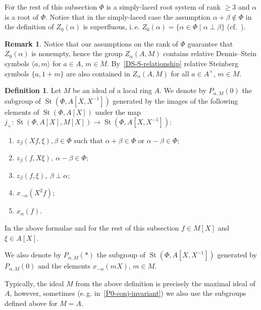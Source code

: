 \documentclass[oneside, 8pt]{amsart}
\theoremstyle{remark}
\theoremstyle{definition}
\numberwithin{lemma}{section}
\numberwithin{prop}{section}
\numberwithin{corollary}{section}
\numberwithin{externaltheorem}{section}
\newtheorem{df}[lemma]{Definition} \Crefname{df}{Definition}{Definitions}
\newtheorem{rem}[lemma]{Remark}
\DeclareMathOperator{\St}{St}
\numberwithin{equation}{section}
\begin{document}
For the rest of this subsection $\Phi$ is a simply-laced root system of rank $\geq 3$ and $\alpha$ is a root of $\Phi$. Notice that in the simply-laced case the assumption $\alpha+\beta\not\in \Phi$ in the definition of $Z_0(\alpha)$ is superfluous, i.\,e. $Z_0(\alpha) = \{ \alpha\in\Phi \mid \alpha \perp \beta \}$
(cf.~\cite[Proposition~5.7]{St71}).

\begin{rem}\label{Z-DS} Notice that our assumptions on the rank of $\Phi$ guarantee that $Z_0(\alpha)$ is nonempty, hence the group $Z_\alpha(A, M)$ contains relative Dennis--Stein symbols $\langle a, m \rangle$ for $a\in A$, $m\in M$.
By~\eqref{DS-S-relationship} relative Steinberg symbols $\{a, 1+m\}$ are also contained in $Z_\alpha(A, M)$ for all $a\in A^\times$, $m\in M$. \end{rem}

\begin{df} \label{defP0}
Let $M$ be an ideal of a local ring $A$. We denote by $P_{\alpha, M}(0)$ the subgroup of $\St(\Phi, A[X, X^{-1}])$ generated by the images of the following elements of $\St(\Phi, A[X])$ under the
 map $j_+ \colon \overline{\St}(\Phi, A[X], M[X]) \to \St(\Phi, A[X, X^{-1}])$:
\begin{enumerate} \item $z_{\beta}(Xf, \xi), \beta \in \Phi \text{ such that }\alpha + \beta \in \Phi\text{ or } \alpha - \beta \in \Phi;$
 \item $z_{\beta}(f, X\xi),\ \alpha - \beta \in \Phi;$
 \item $z_{\beta}(f, \xi),\ \beta \perp \alpha;$
 \item $x_{-\alpha}(X^2f);$
 \item $x_{\alpha}(f)$. \end{enumerate}
In the above formulae and for the rest of this subsection $f \in M[X]$ and $\xi \in A[X]$. 

We also denote by $P_{\alpha, M}(*)$ the subgroup of $\St(\Phi, A[X, X^{-1}])$ generated by $P_{\alpha, M}(0)$ and the elements $x_{-\alpha}(mX)$, $m \in M$.
\end{df}

Typically, the ideal $M$ from the above definition is precisely the maximal ideal of $A$, however, sometimes (e.\,g. in~\cref{P0-conj-invariant}) we also use the subgroups defined above for $M=A$.
\end{document}
